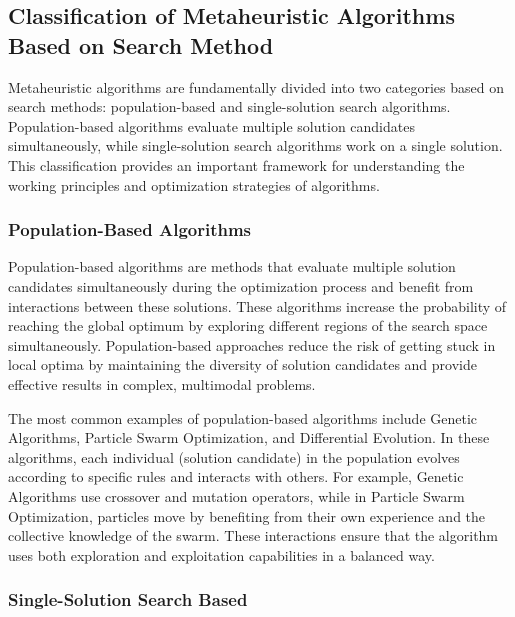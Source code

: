 \subsection{Classification of Metaheuristic Algorithms Based on Search Method}

Metaheuristic algorithms are fundamentally divided into two categories based on search methods: population-based and single-solution search algorithms. Population-based algorithms evaluate multiple solution candidates simultaneously, while single-solution search algorithms work on a single solution. This classification provides an important framework for understanding the working principles and optimization strategies of algorithms.

\subsubsection{Population-Based Algorithms}

Population-based algorithms are methods that evaluate multiple solution candidates simultaneously during the optimization process and benefit from interactions between these solutions. These algorithms increase the probability of reaching the global optimum by exploring different regions of the search space simultaneously. Population-based approaches reduce the risk of getting stuck in local optima by maintaining the diversity of solution candidates and provide effective results in complex, multimodal problems.

The most common examples of population-based algorithms include Genetic Algorithms, Particle Swarm Optimization, and Differential Evolution. In these algorithms, each individual (solution candidate) in the population evolves according to specific rules and interacts with others. For example, Genetic Algorithms use crossover and mutation operators, while in Particle Swarm Optimization, particles move by benefiting from their own experience and the collective knowledge of the swarm. These interactions ensure that the algorithm uses both exploration and exploitation capabilities in a balanced way.

\subsubsection{Single-Solution Search Based}

